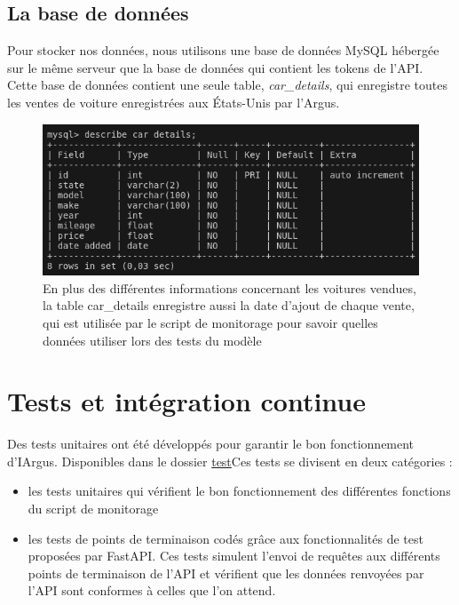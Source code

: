 \documentclass[french]{article}
\begin{document}
    \subsection{La base de données}

    Pour stocker nos données, nous utilisons une base de données MySQL hébergée sur le même serveur que la base de données qui contient les tokens de l'API. Cette base de données contient une seule table, \textit{car\_details}, qui enregistre toutes les ventes de voiture enregistrées aux États-Unis par l'Argus.

    \begin{figure}[h!]
        \includegraphics[width=12cm]{car_details_table}
        \centering
        \caption{En plus des différentes informations concernant les voitures vendues, la table car\_details enregistre aussi la date d'ajout de chaque vente, qui est utilisée par le script de monitorage pour savoir quelles données utiliser lors des tests du modèle}
    \end{figure}

    

    \section{Tests et intégration continue}

    Des tests unitaires ont été développés pour garantir le bon fonctionnement d'IArgus. Disponibles dans le dossier \href{https://github.com/vinpap/iargus/tree/08493c829a37590847164a2f695db763736b9e35/iargus/test}{test}Ces tests se divisent en deux catégories :
    \begin{itemize}
        \item les tests unitaires qui vérifient le bon fonctionnement des différentes fonctions du script de monitorage
        \item les tests de points de terminaison codés grâce aux fonctionnalités de test proposées par FastAPI. Ces tests simulent l'envoi de requêtes aux différents points de terminaison de l'API et vérifient que les données renvoyées par l'API sont conformes à celles que l'on attend.
    \end{itemize}
\end{document}
